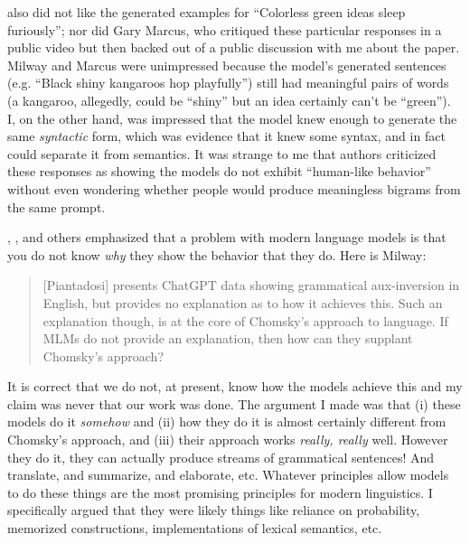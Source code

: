 \documentclass[output=paper,colorlinks,citecolor=brown
]{langscibook}
\begin{document}
\citet{milway2023response} also did not like the generated examples for ``Colorless green ideas sleep furiously''; nor did Gary Marcus, who critiqued these particular responses in a public video but then backed out of a public discussion with me about the paper. Milway and Marcus were unimpressed because the model's generated sentences (e.g. ``Black shiny kangaroos hop playfully'') still had meaningful pairs of words (a kangaroo, allegedly, could be ``shiny'' but an idea certainly can't be ``green''). I, on the other hand, was impressed that the model knew enough to generate the same \textit{syntactic} form, which was evidence that it knew some syntax, and in fact could separate it from semantics. It was strange to me that authors criticized these responses as showing the models do not exhibit ``human-like behavior'' without even wondering whether people would produce meaningless bigrams from the same prompt.


\citet{milway2023response}, \citet{kodner2023linguistics}, and others emphasized that a problem with modern language models is that you do not know \textit{why} they show the behavior that they do. Here is Milway:
\begin{quote}
[Piantadosi] presents ChatGPT data showing grammatical aux-inversion in English, but provides no explanation as to how it achieves this. Such an explanation though, is at the core of Chomsky’s approach to language. If MLMs do not provide an explanation, then how can they supplant Chomsky’s approach?
\end{quote}
It is correct that we do not, at present, know how the models achieve this and my claim was never that our work was done. The argument I made was that (i) these models do it \textit{somehow} and (ii) how they do it is almost certainly different from Chomsky's approach, and (iii) their approach works \textit{really, really} well. However they do it, they can actually produce streams of grammatical sentences! And translate, and summarize, and elaborate, etc. Whatever principles allow models to do these things are the most promising principles for modern linguistics. I specifically argued that they were likely things like reliance on probability, memorized constructions, implementations of lexical semantics, etc. 
\end{document}
